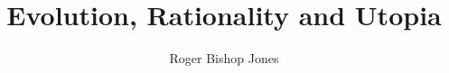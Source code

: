 \documentclass[10pt,titlepage]{book}
\begin{document}
\author{Roger Bishop Jones}
\title{Evolution, Rationality and Utopia}
\maketitle
\tableofcontents
\end{document}
